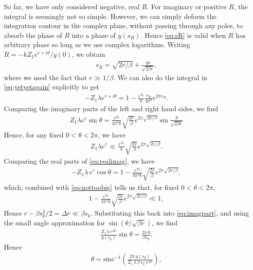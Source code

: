 \documentclass[12pt]{article}
\newcommand{\smax}{s_k}
\numberwithin{equation}{section}
\begin{document}
So far, we have only considered negative, real $R$. For imaginary or positive $R$, the integral is seemingly not so simple. However, we can simply deform the integration contour in the complex plane, without passing through any poles, to absorb the phase of $R$ into a phase of $y(s_R)$. Hence \eqref{eq:sR} is valid when $R$ has arbitrary phase so long as we use complex logarithms. Writing $R = -k Z_1e^{r + i \theta}/y(0)$, we obtain
\begin{align}
s_R = \sqrt{2r/\beta } + \frac{i \theta}{\sqrt{2 \beta  r}},
\end{align}
where we used the fact that $r \gg 1/\beta$. We can also do the integral in \eqref{eq:yetyetagain} explicitly to get
\begin{align} \label{eq:realimag}
- Z_1 \lambda e^{r + i \theta} = 1 - \frac{e^{S_0}}{k} \frac{s_R}{4 \pi ^3} e^{2 \pi s_R}.
\end{align}
Comparing the imaginary parts of the left and right hand sides, we find 
\begin{align} \label{eq:imagpart}
Z_1 \lambda e^{r} \sin \theta = \frac{e^{S_0}}{4 \pi^3 k} \sqrt{\frac{2r}{\beta  }} e^{2 \pi\sqrt{2r/\beta }} \sin \frac{\theta}{\sqrt{2 \beta  r}}
\end{align}
Hence, for any fixed $0 < \theta < 2 \pi$, we have
\begin{align} \label{eq:nottoobig}
Z_1 \lambda e^{r} \ll \frac{e^{S_0}}{k} \sqrt{\frac{2r}{\beta  }} e^{2 \pi \sqrt{2r/\beta }}.
\end{align}
Comparing the real parts of \eqref{eq:realimag}, we have
\begin{align} \label{eq:realpart}
- Z_1 \lambda \,e^{r} \cos \theta = 1 - \frac{e^{S_0}}{4 \pi^3 k} \sqrt{\frac{2r}{\beta  }} e^{2 \pi \sqrt{2 r /\beta}},
\end{align}
which, combined with \eqref{eq:nottoobig} tells us that, for fixed $0 < \theta < 2 \pi$,
\begin{align} \label{eq:sRapproxsk}
1 - \frac{e^{S_0}}{4 \pi^3 k} \sqrt{\frac{2 r}{\beta }} e^{2 \pi \sqrt{2r/\beta }} \ll 1,
\end{align}
Hence $r - \beta \smax^2/2 = \Delta r \ll \beta\smax $. Substituting this back into \eqref{eq:imagpart}, and using the small angle approximation for $\sin (\theta/\sqrt{\beta  r})$, we find
\begin{align}
\frac{Z_1 \lambda \,e^{\Delta r}}{y(\smax)}  \sin \theta = \frac{2 \pi \,\theta}{\beta \smax}.
\end{align}
Hence
\begin{align}
\theta = \text{sinc}^{-1}\left(\frac{2 \pi \,y(\smax)}{ Z_1\, \lambda \,\beta\, \smax\, e^{\Delta r}} \right),
\end{align}
\end{document}
